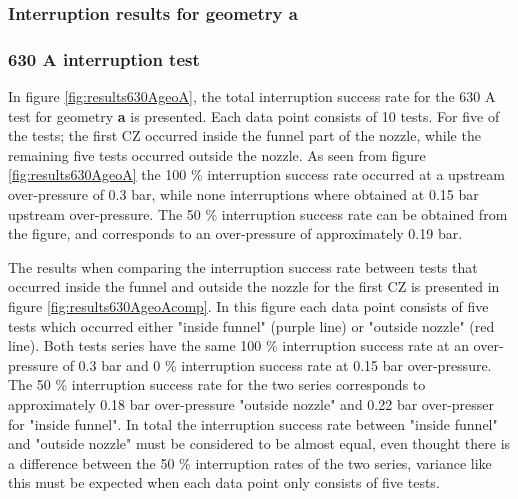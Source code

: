 \documentclass[10pt,b5paper,twoside]{article}
\begin{document}
\subsubsection{Interruption results for geometry \textbf{a}}

\subsubsection*{630 A interruption test}

In figure \ref{fig:results630AgeoA}, the total interruption success rate for the 630 A test for geometry \textbf{a} is presented. Each data point consists of 10 tests. For five of the tests; the first CZ occurred inside the funnel part of the nozzle, while the remaining five tests occurred outside the nozzle. As seen from figure \ref{fig:results630AgeoA} the 100 \% interruption success rate occurred at a upstream over-pressure of 0.3 bar, while none interruptions where obtained at 0.15 bar upstream over-pressure. The 50 \% interruption success rate can be obtained from the figure, and corresponds to an over-pressure of approximately 0.19 bar.

The results when comparing the interruption success rate between tests that occurred inside the funnel and outside the nozzle for the first CZ is presented in figure \ref{fig:results630AgeoAcomp}. In this figure each data point consists of five tests which occurred either "inside funnel" (purple line) or "outside nozzle" (red line). Both tests series have the same 100 \% interruption success rate at an over-pressure of 0.3 bar and 0 \% interruption success rate at 0.15 bar over-pressure. The 50 \% interruption success rate for the two series corresponds to approximately 0.18 bar over-pressure "outside nozzle" and 0.22 bar over-presser for "inside funnel". In total the interruption success rate between "inside funnel" and "outside nozzle" must be considered to be almost equal, even thought there is a difference between the 50 \% interruption rates of the two series, variance like this must be expected when each data point only consists of five tests.
\end{document}
